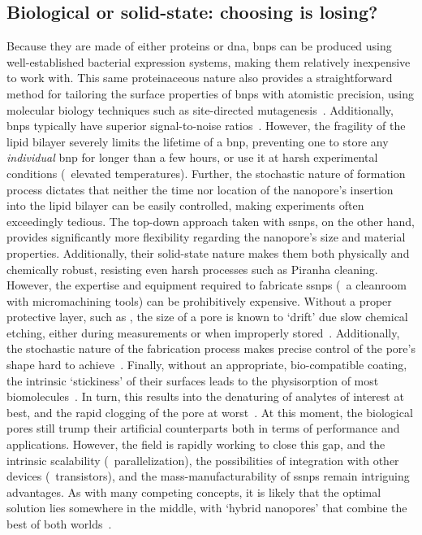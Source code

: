 \subsection{Biological or solid-state: choosing is losing?}
%

Because they are made of either proteins or \gls{dna}, \glspl{bnp} can be produced using well-established
bacterial expression systems, making them relatively inexpensive to work with. This same proteinaceous nature
also provides a straightforward method for tailoring the surface properties of \glspl{bnp} with atomistic
precision, using molecular biology techniques such as site-directed
mutagenesis~\cite{Howorka-2001,RinconRestrepo-2011}. Additionally, \glspl{bnp} typically have superior
signal-to-noise ratios~\cite{Fragasso-2020}. However, the fragility of the lipid bilayer severely limits the
lifetime of a \gls{bnp}, preventing one to store any \emph{individual} \gls{bnp} for longer than a few hours,
or use it at harsh experimental conditions (\eg~elevated temperatures). Further, the stochastic nature of
formation process dictates that neither the time nor location of the nanopore's insertion into the lipid
bilayer can be easily controlled, making experiments often exceedingly tedious. The top-down approach taken
with \glspl{ssnp}, on the other hand, provides significantly more flexibility regarding the nanopore's size
and material properties. Additionally, their solid-state nature makes them both physically and chemically
robust, resisting even harsh processes such as Piranha cleaning. However, the expertise and equipment required
to fabricate \glspl{ssnp} (\ie~a cleanroom with micromachining tools) can be prohibitively expensive. Without
a proper protective layer, such as , the size of a  pore is known to `drift' due slow
chemical etching, either during measurements or when improperly stored~\cite{Chou-2020}. Additionally, the
stochastic nature of the fabrication process makes precise control of the pore's shape hard to
achieve~\cite{vandenHout-2010}. Finally, without an appropriate, bio-compatible coating, the intrinsic
`stickiness' of their surfaces leads to the physisorption of most
biomolecules~\cite{Eggenberger-2019,Awasthi-2020}. In turn, this results into the denaturing of analytes of
interest at best, and the rapid clogging of the pore at worst~\cite{Yusko-2011}. At this moment, the
biological pores still trump their artificial counterparts both in terms of performance and applications.
However, the field is rapidly working to close this gap, and the intrinsic scalability (\eg~parallelization),
the possibilities of integration with other devices (\eg~transistors), and the mass-manufacturability of
\glspl{ssnp} remain intriguing advantages. As with many competing concepts, it is likely that the optimal
solution lies somewhere in the middle, with `hybrid nanopores' that combine the best of both
worlds~\cite{Hall-2010,Im-2010,Cai-2018}.


